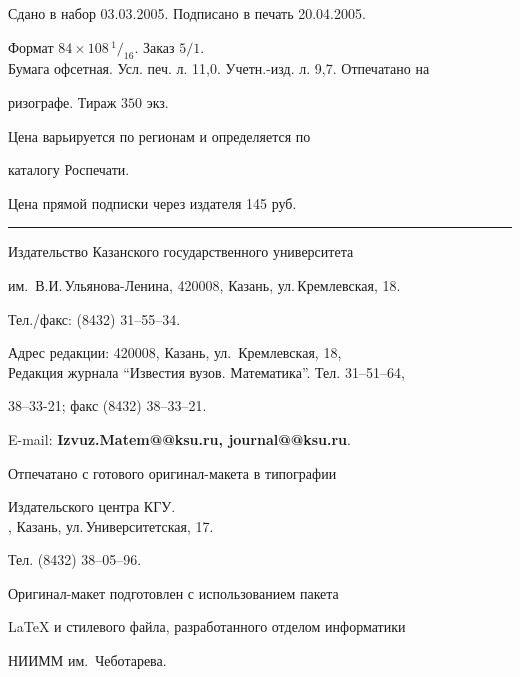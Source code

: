 \noindent Сдано в набор 03.03.2005. Подписано в печать 20.04.2005.


Формат $84\times 108 \,^1/_{16}$. Заказ $5/1$.\\


Бумага офсетная. Усл. печ. л. 11,0. Учетн.-изд. л. 9,7. Отпечатано на 


ризографе. Тираж $350$ экз. 





\noindent Цена варьируется по регионам и определяется по 


каталогу Роспечати. 





\noindent Цена прямой подписки через издателя 145 руб. 


\bigskip


\hrule


\bigskip


\noindent Издательство Казанского государственного университета


им.~В.И.\,Ульянова-Ленина, 420008, Казань, ул.\,Кремлевская, 18.


Тел./факс: (8432) 31--55--34.\\


\smallskip





\noindent Адрес редакции: 420008, Казань, ул.~Кремлевская, 18,\\  


Редакция журнала  ``Известия вузов. Математика''. Тел. 31--51--64,


38--33-21; факс (8432) 38--33--21.





\noindent E-mail: {\bf Izvuz.Matem@@ksu.ru, journal@@ksu.ru}. \par


\bigskip 


\noindent Отпечатано с готового оригинал-макета в типографии


Издательского центра КГУ. \\





, Казань, ул.\,Университетская, 17.


Тел. (8432) 38--05--96. \par


\bigskip


\noindent Оригинал-макет подготовлен с использованием пакета


\AmS\LaTeX{} и стилевого файла, разработанного отделом информатики


НИИММ им.~Чеботарева.









